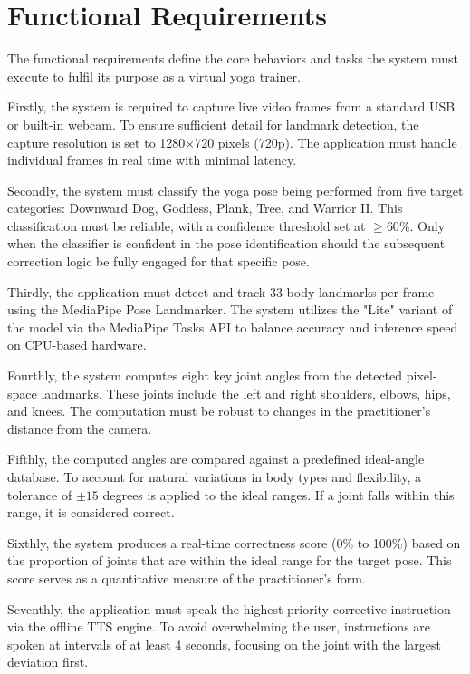 \section{Functional Requirements}
The functional requirements define the core behaviors and tasks the system must execute to fulfil its purpose as a virtual yoga trainer.

Firstly, the system is required to capture live video frames from a standard USB or built-in webcam. To ensure sufficient detail for landmark detection, the capture resolution is set to 1280$\times$720 pixels (720p). The application must handle individual frames in real time with minimal latency.

Secondly, the system must classify the yoga pose being performed from five target categories: Downward Dog, Goddess, Plank, Tree, and Warrior II. This classification must be reliable, with a confidence threshold set at $\geq 60\%$. Only when the classifier is confident in the pose identification should the subsequent correction logic be fully engaged for that specific pose.

Thirdly, the application must detect and track 33 body landmarks per frame using the MediaPipe Pose Landmarker. The system utilizes the "Lite" variant of the model via the MediaPipe Tasks API to balance accuracy and inference speed on CPU-based hardware.

Fourthly, the system computes eight key joint angles from the detected pixel-space landmarks. These joints include the left and right shoulders, elbows, hips, and knees. The computation must be robust to changes in the practitioner's distance from the camera.

Fifthly, the computed angles are compared against a predefined ideal-angle database. To account for natural variations in body types and flexibility, a tolerance of $\pm 15$ degrees is applied to the ideal ranges. If a joint falls within this range, it is considered correct.

Sixthly, the system produces a real-time correctness score (0\% to 100\%) based on the proportion of joints that are within the ideal range for the target pose. This score serves as a quantitative measure of the practitioner's form.

Seventhly, the application must speak the highest-priority corrective instruction via the offline TTS engine. To avoid overwhelming the user, instructions are spoken at intervals of at least 4 seconds, focusing on the joint with the largest deviation first.

